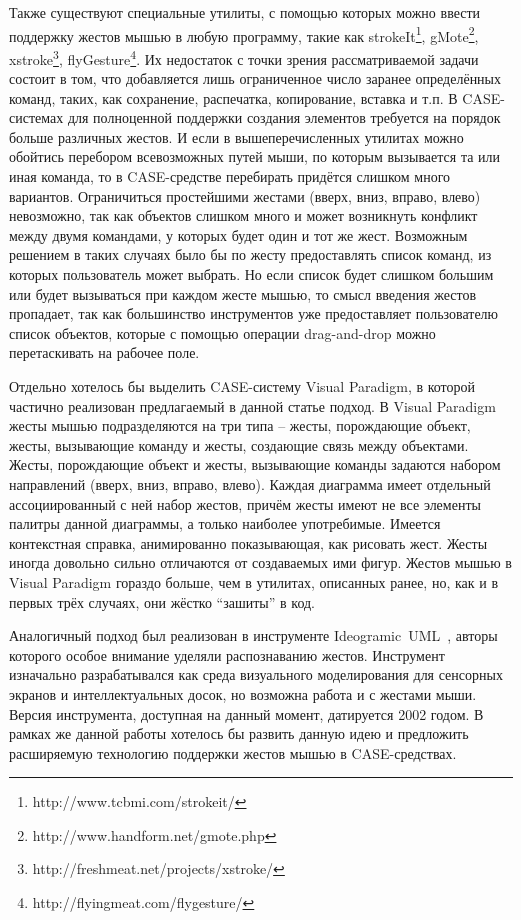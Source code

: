\documentclass[a5paper]{article}
\begin{document}
Также существуют специальные утилиты, с помощью которых можно ввести поддержку жестов мышью в любую программу, такие как strokeIt\footnote{http://www.tcbmi.com/strokeit/}, gMote\footnote{http://www.handform.net/gmote.php}, xstroke\footnote{http://freshmeat.net/projects/xstroke/}, flyGesture\footnote{http://flyingmeat.com/flygesture/}. Их недостаток с точки зрения рассматриваемой задачи состоит в том, что добавляется лишь ограниченное число заранее определённых команд, таких, как сохранение, распечатка, копирование, вставка и т.п. В CASE-системах для полноценной поддержки создания элементов требуется на порядок больше различных жестов. И если в вышеперечисленных утилитах можно обойтись перебором всевозможных путей мыши, по которым вызывается та или иная команда, то в CASE-средстве перебирать придётся слишком много вариантов. Ограничиться простейшими жестами (вверх, вниз, вправо, влево) невозможно, так как объектов слишком много и может возникнуть конфликт между двумя командами, у которых будет один и тот же жест. Возможным решением в таких случаях было бы по жесту предоставлять список команд, из которых пользователь может выбрать. Но если список будет слишком большим или будет вызываться при каждом жесте мышью, то смысл введения жестов пропадает, так как большинство инструментов уже предоставляет пользователю список объектов, которые с помощью операции drag-and-drop можно перетаскивать на рабочее поле.

Отдельно хотелось бы выделить CASE-систему Visual Paradigm, в которой частично реализован предлагаемый в данной статье подход. В Visual Paradigm жесты мышью подразделяются на три типа – жесты, порождающие объект, жесты, вызывающие команду и жесты, создающие связь между объектами. Жесты, порождающие объект и жесты, вызывающие команды задаются набором направлений (вверх, вниз, вправо, влево). Каждая диаграмма имеет отдельный ассоциированный с ней набор жестов, причём жесты имеют не все элементы палитры данной диаграммы, а только наиболее употребимые. Имеется контекстная справка, анимированно показывающая, как рисовать жест. Жесты иногда довольно сильно отличаются от создаваемых ими фигур. Жестов мышью в Visual Paradigm гораздо больше, чем в  утилитах, описанных ранее, но, как и в первых трёх случаях, они жёстко ``зашиты'' в код. 

Аналогичный подход был реализован в инструменте Ideogramic~UML~\cite{ideogramic}, авторы которого особое внимание уделяли распознаванию жестов. Инструмент изначально разрабатывался как среда визуального моделирования для сенсорных экранов и интеллектуальных досок, но возможна работа и с жестами мыши. Версия инструмента, доступная на данный момент, датируется 2002 годом. В рамках же данной работы хотелось бы развить данную идею и предложить расширяемую технологию поддержки жестов мышью в CASE-средствах. 
\end{document}
